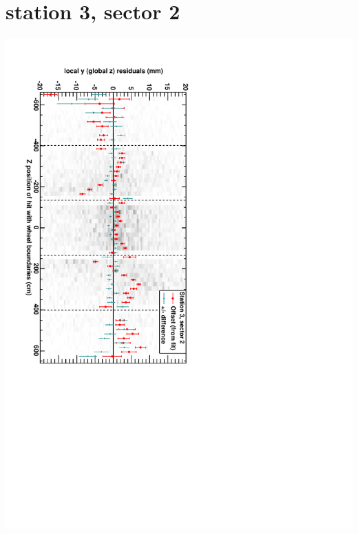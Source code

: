 \documentclass[compress]{beamer}
\begin{document}
\section*{station 3, sector 2}
\begin{frame} \vfill \mbox{\hspace{-1 cm}\includegraphics[height=1.2\linewidth, angle=90]{DTzVsZ_st3_sr02.pdf}} \end{frame}
\end{document}
